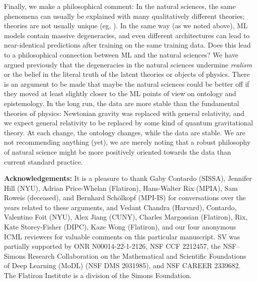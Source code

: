 \documentclass{article}
\renewcommand{\paragraph}[1]{\noindent\par\textbf{#1}}
\begin{document}
Finally, we make a philosophical comment:
In the natural sciences, the same phenomena can usually be explained with many qualitatively different theories; theories are not usually unique (eg, \citealt{hogg, peebles}).
In the same way (as we noted above), ML models contain massive degeneracies, and even different architectures can lead to near-identical predictions after training on the same training data.
Does this lead to a philosophical connection between ML and the natural sciences?
We have argued previously \cite{hogg} that the degeneracies in the natural sciences undermine \emph{realism} or the belief in the literal truth of the latent theories or objects of physics.
There is an argument to be made that maybe the natural sciences could be better off if they moved at least slightly closer to the ML points of view on ontology and epistemology.
In the long run, the data are more stable than the fundamental theories of physics:
Newtonian gravity was replaced with general relativity, and we expect general relativity to be replaced by some kind of quantum gravitational theory.
At each change, the ontology changes, while the data are stable.
We are not recommending anything (yet), we are merely noting that a robust philosophy of natural science might be more positively oriented towards the data than current standard practice.

\paragraph{Acknowledgements:}
It is a pleasure to thank
  Gaby Contardo (SISSA),
  Jennifer Hill (NYU),
  Adrian Price-Whelan (Flatiron),
  Hans-Walter Rix (MPIA),
  Sam Roweis (deceased), and
  Bernhard Sch\"olkopf (MPI-IS)
for conversations over the years related to these arguments, and
  Vedant Chandra (Harvard),
  Contardo,
  Valentino Foit (NYU),
  Alex Jiang (CUNY),
  Charles Margossian (Flatiron),
  Rix,
  Kate Storey-Fisher (DIPC),
  Kaze Wong (Flatiron), and
  our four anonymous ICML reviewers
for valuable comments on this particular manuscript.
SV was partially supported by ONR N00014-22-1-2126, NSF CCF 2212457, the NSF–Simons Research Collaboration
on the Mathematical and Scientific Foundations of Deep Learning (MoDL) (NSF DMS 2031985), and NSF
CAREER 2339682.
The Flatiron Institute is a division of the Simons Foundation.
\end{document}
